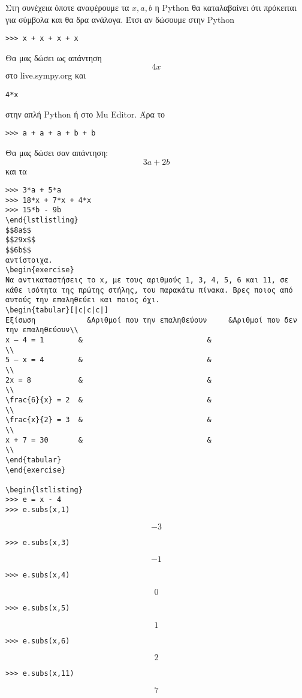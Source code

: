 Στη συνέχεια όποτε αναφέρουμε τα $x, a, b$ η Python θα καταλαβαίνει ότι πρόκειται για σύμβολα και θα δρα ανάλογα.
Έτσι αν δώσουμε στην Python
\begin{lstlisting}
>>> x + x + x + x
\end{lstlisting}
Θα μας δώσει ως απάντηση
$$4x$$
στο live.sympy.org
και
\begin{lstlisting}
4*x
\end{lstlisting}
στην απλή Python ή στο Mu Editor.
Άρα το 
\begin{lstlisting}
>>> a + a + a + b + b
\end{lstlisting}
Θα μας δώσει σαν απάντηση:
$$3a+2b$$
και τα 
\begin{lstlisting}
>>> 3*a + 5*a 
>>> 18*x + 7*x + 4*x
>>> 15*b - 9b
\end{lstlistling}
$$8a$$
$$29x$$
$$6b$$
αντίστοιχα.
\begin{exercise}
Να αντικαταστήσεις το x, με τους αριθμούς 1, 3, 4, 5, 6 και 11, σε κάθε ισότητα της πρώτης στήλης, του παρακάτω πίνακα. Βρες ποιος από αυτούς την επαληθεύει και ποιος όχι.
\begin{tabular}[|c|c|c|]
Εξίσωση 	       &Αριθμοί που την επαληθεύουν 	&Αριθμοί που δεν την επαληθεύουν\\
x – 4 = 1        &                             &                                \\
5 – x = 4        &                             &                                \\
2x = 8           &                             &                                \\
\frac{6}{x} = 2  &                             &                                \\
\frac{x}{2} = 3  &                             &                                \\
x + 7 = 30 	  	 &                             &                                \\
\end{tabular}
\end{exercise}

\begin{lstlisting}
>>> e = x - 4
>>> e.subs(x,1)
\end{lstlisting}
$$−3$$
\begin{lstlisting}
>>> e.subs(x,3)
\end{lstlisting}
$$−1$$
\begin{lstlisting}
>>> e.subs(x,4)
\end{lstlisting}
$$0$$
\begin{lstlisting}
>>> e.subs(x,5)
\end{lstlisting}
$$1$$
\begin{lstlisting}
>>> e.subs(x,6)
\end{lstlisting}
$$2$$
\begin{lstlisting}
>>> e.subs(x,11)
\end{lstlisting}
$$7$$

